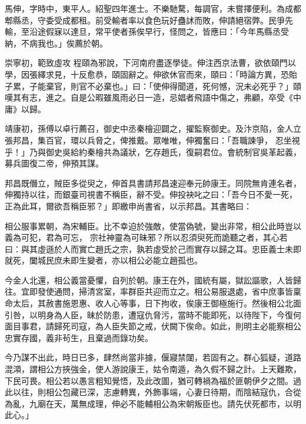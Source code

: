\begin{pinyinscope}
 馬伸，字時中，東平人。紹聖四年進士。不樂馳騖，每調官，未嘗擇便利。為成都郫縣丞，守委受成都租。前受輸者率以食色玩好蠱訹而敗，伸請絕宿弊。民爭先輸，至沿途假寐以達旦，常平使者孫俟早行，怪問之，皆應曰：「今年馬縣丞受納，不病我也。」俟薦於朝。



 崇寧初，範致虛攻
 程頤為邪說，下河南府盡逐學徒。伸注西京法曹，欲依頤門以學，因張繹求見，十反愈恭，頤固辭之。伸欲休官而來，頤曰：「時論方異，恐貽子累，子能棄官，則官不必棄也。」曰：「使伸得聞道，死何憾，況未必死乎？」頤嘆其有志，進之。自是公暇雖風雨必日一造，忌娼者飛語中傷之，弗顧，卒受《中庸》以歸。



 靖康初，孫傅以卓行薦召，御史中丞秦檜迎闢之，擢監察御史。及汴京陷，金人立張邦昌，集百官，環以兵脅之，俾推戴。眾唯唯，伸獨奮曰：「吾職諫爭，
 忍坐視乎！」乃與御史吳給約秦檜共為議狀，乞存趙氏，復嗣君位。會統制官吳革起義，募兵圖復二帝，伸預其謀。



 邦昌既僭立，賊臣多從臾之，伸首具書請邦昌速迎奉元帥康王。同院無肯連名者，伸獨持以往，而銀臺司視書不稱臣，辭不受。伸投袂叱之曰：「吾今日不愛一死，正為此耳，爾欲吾稱臣邪？」即繳申尚書省，以示邦昌。其書略曰：



 相公服事累朝，為宋輔臣。比不幸迫於強敵，使當偽號，變出非常，相公此時豈以義為可犯，君為可忘，
 宗社神靈為可昧邪？所以忍須臾死而詭聽之者，其心若曰：與其虛遜於人而實亡趙氏之宗，孰若虛受於己而實存以歸之耳。忠臣義士未即就死，闔城民庶未即生變者，亦以相公必能立趙孤也。



 今金人北還，相公義當憂懼，自列於朝。康王在外，國統有屬，獄訟謳歌，人皆歸往。宜即發使通問，掃清宮室，率群臣共迎而立之。相公易服退處，省中庶事皆稟命太后，其赦書施恩惠、收人心等事，日下拘收，俟康王御極施行。然後相公北面
 引咎，以明身為人臣，昧於防患，遭寇仇脅污，當時不能即死，以待陛下，今復何面目事君，請歸死司寇，為人臣失節之戒，伏闕下俟命。如此，則明主必能察相公忠實存國，義非茍生，且棄過而錄功矣。



 今乃謀不出此，時日已多，肆然尚當非據，偃寢禁闥，若固有之。群心狐疑，道路混澒，謂相公方挾強金，使人游說康王，姑令南遁，為久假不歸之計。上天難欺，下民可畏。相公若以愚言粗知覺悟，及此改圖，猶可轉禍為福於匪朝伊夕之間。過
 此以往，則相公包藏已深，志慮轉異，外飾事端，心妻日待期，而陰結寇仇，合從為亂，九廟在天，萬無成理，伸必不能輔相公為宋朝叛臣也。請先伏死都市，以明此心。」




\end{pinyinscope}
